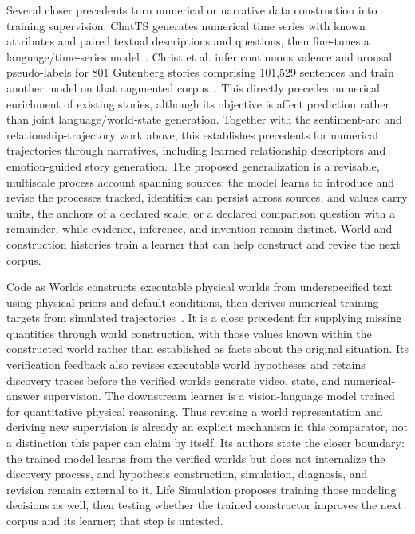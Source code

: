\documentclass[10pt]{article}
\begin{document}
Several closer precedents turn numerical or narrative data construction into
training supervision. ChatTS generates numerical time series with known
attributes and paired textual descriptions and questions, then fine-tunes a
language/time-series model~\cite{xie2025chatts}. Christ et al. infer continuous
valence and arousal pseudo-labels for 801 Gutenberg stories comprising 101,529
sentences and train another model on that augmented
corpus~\cite{christ2024emotionalTrajectories}. This directly precedes numerical
enrichment of existing stories, although its objective is affect prediction
rather than joint language/world-state generation. Together with the
sentiment-arc and relationship-trajectory work above, this establishes
precedents for numerical trajectories through narratives, including learned
relationship descriptors and emotion-guided story generation. The proposed
generalization is a revisable, multiscale process account spanning sources:
the model learns to introduce and revise the processes tracked, identities
can persist across sources, and values carry units, the anchors of a declared
scale, or a declared comparison question with a remainder, while evidence, inference, and invention remain
distinct. World and construction histories train a learner that can help
construct and revise the next corpus.

Code as Worlds constructs
executable physical worlds from underspecified text using physical priors and
default conditions, then derives numerical training targets from simulated
trajectories~\cite{wang2026codeAsWorlds}. It is a close precedent for supplying
missing quantities through world construction, with those values known within
the constructed world rather than established as facts about the original
situation. Its verification feedback also revises executable world hypotheses
and retains discovery traces before the verified worlds generate video, state,
and numerical-answer supervision. The downstream learner is a vision-language
model trained for quantitative physical reasoning. Thus revising a world
representation and deriving new supervision is already an explicit mechanism
in this comparator, not a distinction this paper can claim by itself. Its
authors state the closer boundary: the trained model learns from the verified
worlds but does not internalize the discovery process, and hypothesis
construction, simulation, diagnosis, and revision remain external to it. Life
Simulation proposes training those modeling decisions as well, then testing
whether the trained constructor improves the next corpus and its learner; that
step is untested.
\end{document}

